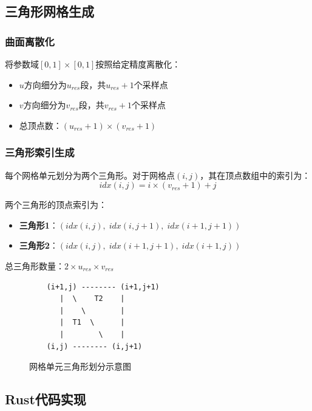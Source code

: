 \documentclass[12pt,a4paper]{article}
\begin{document}
\subsection{三角形网格生成}

\subsubsection{曲面离散化}

将参数域$[0,1] \times [0,1]$按照给定精度离散化：
\begin{itemize}
    \item $u$方向细分为$u_{res}$段，共$u_{res}+1$个采样点
    \item $v$方向细分为$v_{res}$段，共$v_{res}+1$个采样点
    \item 总顶点数：$(u_{res}+1) \times (v_{res}+1)$
\end{itemize}

\subsubsection{三角形索引生成}

每个网格单元划分为两个三角形。对于网格点$(i,j)$，其在顶点数组中的索引为：
\begin{equation}
idx(i,j) = i \times (v_{res}+1) + j
\end{equation}

两个三角形的顶点索引为：
\begin{itemize}
    \item \textbf{三角形1}：$(idx(i,j), \; idx(i,j+1), \; idx(i+1,j+1))$
    \item \textbf{三角形2}：$(idx(i,j), \; idx(i+1,j+1), \; idx(i+1,j))$
\end{itemize}

总三角形数量：$2 \times u_{res} \times v_{res}$

\begin{figure}[H]
\centering
\begin{verbatim}
    (i+1,j) -------- (i+1,j+1)
       |  \    T2    |
       |    \        |
       |  T1  \      |
       |        \    |
    (i,j) -------- (i,j+1)
\end{verbatim}
\caption{网格单元三角形划分示意图}
\end{figure}

\subsection{Rust代码实现}
\end{document}
